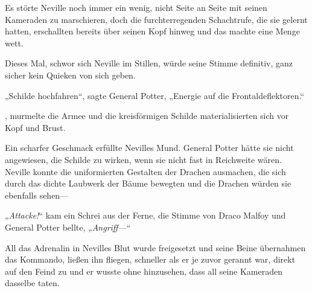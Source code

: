 Es störte Neville noch immer ein wenig, nicht Seite an Seite mit seinen Kameraden zu marschieren, doch die furchterregenden Schachtrufe, die sie gelernt hatten, erschallten bereits über seinen Kopf hinweg und das machte eine Menge wett.

Dieses Mal, schwor sich Neville im Stillen, würde seine Stimme definitiv, ganz sicher kein Quieken von sich geben.

„Schilde hochfahren“, sagte General Potter, „Energie auf die Frontaldeflektoren.“

, murmelte die Armee und die kreisförmigen Schilde materialisierten sich vor Kopf und Brust.

Ein scharfer Geschmack erfüllte Nevilles Mund. General Potter hätte sie nicht angewiesen, die Schilde zu wirken, wenn sie nicht fast in Reichweite wären. Neville konnte die uniformierten Gestalten der Drachen ausmachen, die sich durch das dichte Laubwerk der Bäume bewegten und die Drachen würden sie ebenfalls sehen—

„\emph{Attacke!}“ kam ein Schrei aus der Ferne, die Stimme von Draco Malfoy und General Potter bellte, „\emph{Angriff—}“

All das Adrenalin in Nevilles Blut wurde freigesetzt und seine Beine übernahmen das Kommando, ließen ihn fliegen, schneller als er je zuvor gerannt war, direkt auf den Feind zu und er wusste ohne hinzusehen, dass all seine Kameraden dasselbe taten.

